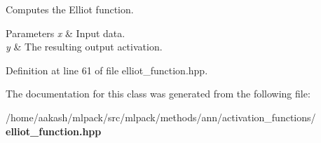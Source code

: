 Computes the Elliot function. 


\begin{DoxyParams}{Parameters}
{\em x} & Input data. \\
\hline
{\em y} & The resulting output activation. \\
\hline
\end{DoxyParams}


Definition at line 61 of file elliot\+\_\+function.\+hpp.



The documentation for this class was generated from the following file\+:\begin{DoxyCompactItemize}
\item 
/home/aakash/mlpack/src/mlpack/methods/ann/activation\+\_\+functions/\textbf{ elliot\+\_\+function.\+hpp}\end{DoxyCompactItemize}
